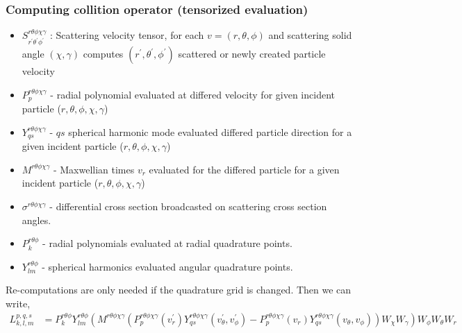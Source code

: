 \documentclass[mathserif, aspectratio=169]{beamer}
\begin{document}
	\begin{frame}
		\frametitle{Computing collition operator (tensorized evaluation)}
		\begin{itemize}
			\item $S^{r\theta\phi\chi\gamma}_{r^\prime\theta^\prime \phi^\prime}$ : Scattering velocity tensor, for each $v=(r,\theta,\phi)$ and scattering solid angle $(\chi,\gamma)$ computes $(r^\prime,\theta^\prime,\phi^\prime)$ scattered or newly created particle velocity
			\item $P^{r\theta\phi\chi\gamma}_{p}$ - radial polynomial evaluated at differed velocity for given incident particle ($r,\theta,\phi,\chi,\gamma$)
			\item $Y^{r\theta\phi\chi\gamma}_{qs}$ - $qs$ spherical harmonic mode evaluated differed particle direction for a given incident particle ($r,\theta,\phi,\chi,\gamma$)
			\item $M^{r\theta\phi\chi\gamma}$ - Maxwellian times $v_r$ evaluated for the differed particle for a given incident particle ($r,\theta,\phi,\chi,\gamma$)
			\item $\sigma^{r\theta\phi\chi\gamma}$ - differential cross section broadcasted on scattering cross section angles. 
			\item $P^{r\theta\phi}_{k}$ - radial polynomials evaluated at radial quadrature points. 
			\item $Y_{lm}^{r\theta\phi}$ - spherical harmonics evaluated angular quadrature points. 
		\end{itemize}
		Re-computations are only needed if the quadrature grid is changed. Then we can write, 
		\tiny
		{
			\begin{align*}
				{L}_{k,l,m}^{p,q,s} &=P^{r\theta\phi}_{k} Y_{lm}^{r\theta\phi} \left( M^{r\theta\phi\chi\gamma} \left(P^{r\theta\phi\chi\gamma}_{p} (v^\prime_r)	Y^{r\theta\phi\chi\gamma}_{qs} (v^\prime_\theta,v^{\prime}_\phi) - P^{r\theta\phi\chi\gamma}_{p} (v_r)	Y^{r\theta\phi\chi\gamma}_{qs} (v_\theta,v_\phi) \right) W_\chi W_\gamma \right) W_\phi W_\theta W_r
			\end{align*}
		}%
	\end{frame}
	
\end{document}
